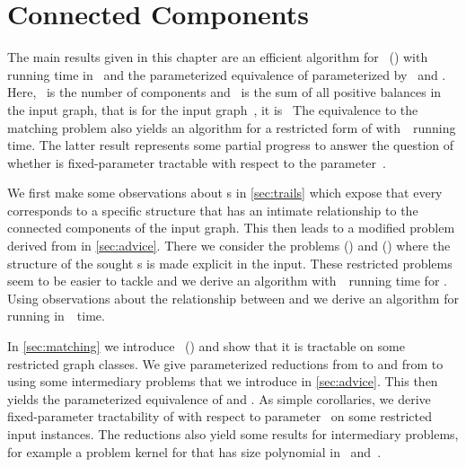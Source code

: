 \chapter{Connected Components}\label{sec:conncomp}
The main results given in this chapter are an efficient algorithm for \pWMEE{}~(\pWMEEs{}) with running time in~ and the parameterized equivalence of \pWMEEs{} parameterized by~ and \pCBM{}. Here,~ is the number of components and~ is the sum of all positive balances in the input graph, that is for the input graph~, it is~ The equivalence to the matching problem also yields an algorithm for a restricted form of \pWMEEs{} with~~running time. The latter result represents some partial progress to answer the question of whether \pWMEEs{} is fixed-parameter tractable with respect to the parameter~.

We first make some observations about \EE s in \autoref{sec:trails} which expose that every \EE{} corresponds to a specific structure that has an intimate relationship to the connected components of the input graph. This then leads to a modified problem derived from \pWMEEs{} in \autoref{sec:advice}. There we consider the problems \pWMEEA{} (\pWMEEAs{}) and \pWMEECA{} (\pWMEECAs) where the structure of the sought \EE s is made explicit in the input. These restricted problems seem to be easier to tackle and we derive an algorithm with~~running time for \pWMEECAs{}. Using observations about the relationship between \pWMEEs{} and \pWMEECAs{} we derive an algorithm for \pWMEEs{} running in~~time.

In \autoref{sec:matching} we introduce \pCBM{}~(\pCBMs{}) and show that it is tractable on some restricted graph classes. We give parameterized reductions from \pWMEEs{} to \pCBMs{} and from \pCBMs{} to \pWMEEs{} using some intermediary problems that we introduce in \autoref{sec:advice}. This then yields the parameterized equivalence of \pCBMs{} and \pWMEEs{}. As simple corollaries, we derive fixed-parameter tractability of \pWMEEs{} with respect to parameter~ on some restricted input instances. The reductions also yield some results for intermediary problems, for example a problem kernel for \pWMEECAs{} that has size polynomial in~ and~.

